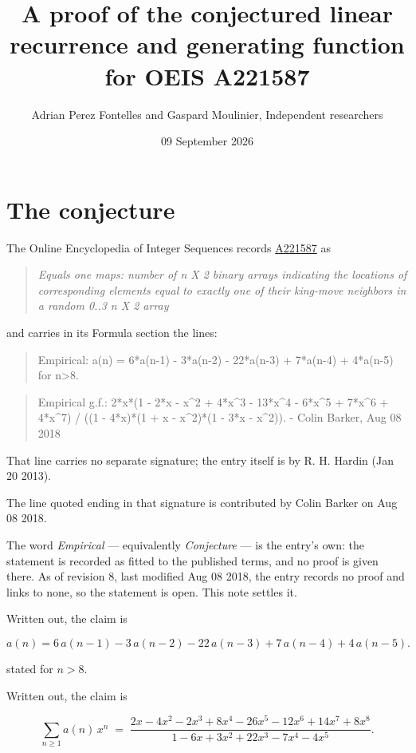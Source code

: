 \documentclass[11pt]{article}
\title{A proof of the conjectured linear recurrence and generating function for OEIS A221587}
\author{Adrian Perez Fontelles and Gaspard Moulinier, Independent researchers}
\date{09 September 2026}
\theoremstyle{definition}
\begin{document}
\maketitle
\section{The conjecture}

The Online Encyclopedia of Integer Sequences records \href{https://oeis.org/A221587}{A221587} as

\begin{quote}\itshape Equals one maps: number of n X 2 binary arrays indicating the locations of corresponding elements equal to exactly one of their king-move neighbors in a random 0..3 n X 2 array\end{quote}

and carries in its Formula section the lines:

\begin{quote}\ttfamily Empirical: a(n) = 6*a(n-1) - 3*a(n-2) - 22*a(n-3) + 7*a(n-4) + 4*a(n-5) for n>8.\end{quote}

\begin{quote}\ttfamily Empirical g.f.: 2*x*(1 - 2*x - x\textasciicircum{}2 + 4*x\textasciicircum{}3 - 13*x\textasciicircum{}4 - 6*x\textasciicircum{}5 + 7*x\textasciicircum{}6 + 4*x\textasciicircum{}7) / ((1 - 4*x)*(1 + x - x\textasciicircum{}2)*(1 - 3*x - x\textasciicircum{}2)). - Colin Barker, Aug 08 2018\end{quote}

That line carries no separate signature; the entry itself is by R. H. Hardin (Jan 20 2013).

The line quoted ending in that signature is contributed by Colin Barker on Aug 08 2018.

The word {\itshape Empirical} --- equivalently {\itshape Conjecture} --- is the entry's own: the statement is recorded as fitted to the published terms, and no proof is given there. As of revision 8, last modified Aug 08 2018, the entry records no proof and links to none, so the statement is open. This note settles it.

Written out, the claim is

\[a(n) = 6\,a(n-1) - 3\,a(n-2) - 22\,a(n-3) + 7\,a(n-4) + 4\,a(n-5).\]

stated for $n > 8$.

Written out, the claim is

\[\sum_{n \ge 1} a(n)\,x^n \;=\; \frac{2x - 4x^{2} - 2x^{3} + 8x^{4} - 26x^{5} - 12x^{6} + 14x^{7} + 8x^{8}}{1 - 6x + 3x^{2} + 22x^{3} - 7x^{4} - 4x^{5}}.\]
\end{document}
